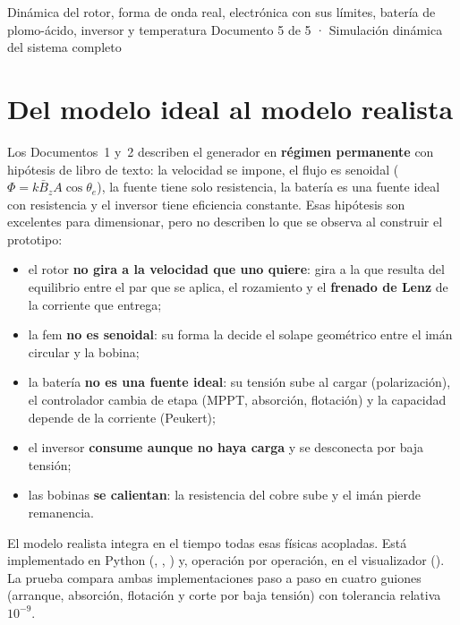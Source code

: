\documentclass[11pt]{article}
\begin{document}
        {Dinámica del rotor, forma de onda real, electrónica con sus límites, batería de plomo-ácido, inversor y temperatura}
        {Documento 5 de 5 · Simulación dinámica del sistema completo}

\tableofcontents
\newpage

\section{Del modelo ideal al modelo realista}
Los Documentos~1 y~2 describen el generador en \textbf{régimen permanente} con hipótesis de libro de texto:
la velocidad se impone, el flujo es senoidal ($\Phi=k\bar B_zA\cos\theta_e$), la fuente tiene solo resistencia,
la batería es una fuente ideal con resistencia y el inversor tiene eficiencia constante. Esas hipótesis son
excelentes para dimensionar, pero no describen lo que se observa al construir el prototipo:
\begin{itemize}
  \item el rotor \textbf{no gira a la velocidad que uno quiere}: gira a la que resulta del equilibrio entre el par
        que se aplica, el rozamiento y el \textbf{frenado de Lenz} de la corriente que entrega;
  \item la fem \textbf{no es senoidal}: su forma la decide el solape geométrico entre el imán circular y la bobina;
  \item la batería \textbf{no es una fuente ideal}: su tensión sube al cargar (polarización), el controlador cambia
        de etapa (MPPT, absorción, flotación) y la capacidad depende de la corriente (Peukert);
  \item el inversor \textbf{consume aunque no haya carga} y se desconecta por baja tensión;
  \item las bobinas \textbf{se calientan}: la resistencia del cobre sube y el imán pierde remanencia.
\end{itemize}

El modelo realista integra en el tiempo todas esas físicas acopladas. Está implementado en Python
(, , ) y,
operación por operación, en el visualizador (). La prueba
 compara ambas implementaciones paso a paso en cuatro guiones
(arranque, absorción, flotación y corte por baja tensión) con tolerancia relativa $10^{-9}$.
\end{document}
